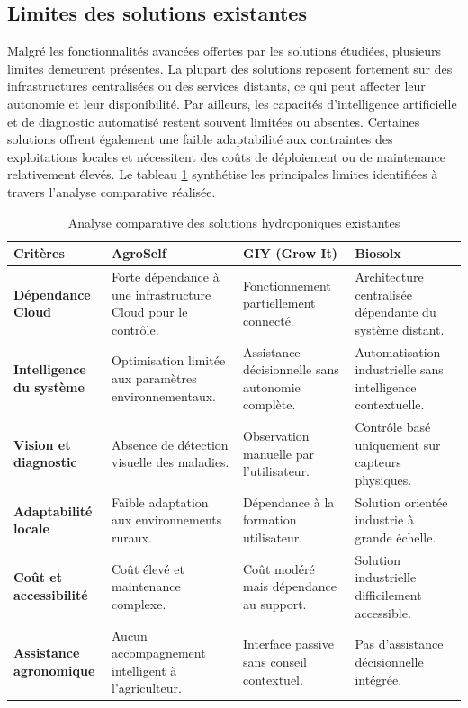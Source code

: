 \subsection{Limites des solutions existantes}

Malgré les fonctionnalités avancées offertes par les solutions étudiées, plusieurs limites demeurent présentes. La plupart des solutions reposent fortement sur des infrastructures centralisées ou des services distants, ce qui peut affecter leur autonomie et leur disponibilité. Par ailleurs, les capacités d’intelligence artificielle et de diagnostic automatisé restent souvent limitées ou absentes. Certaines solutions offrent également une faible adaptabilité aux contraintes des exploitations locales et nécessitent des coûts de déploiement ou de maintenance relativement élevés. Le tableau \ref{tab:comparaison-solutions} synthétise les principales limites identifiées à travers l’analyse comparative réalisée.

\begin{table}[!htbp] 
	\centering
	\small
	\renewcommand{\arraystretch}{1.5}
	\begin{tabular}{|p{3.5cm}|p{3.5cm}|p{3.5cm}|p{3.5cm}|}
		\hline
		\rowcolor[HTML]{ECECEC} 
		\textbf{Critères} & \textbf{AgroSelf} & \textbf{GIY (Grow It)} & \textbf{Biosolx} \\ \hline
		
		\textbf{Dépendance Cloud} & Forte dépendance à une infrastructure Cloud pour le contrôle. & Fonctionnement partiellement connecté. & Architecture centralisée dépendante du système distant. \\ \hline
		
		\textbf{Intelligence du système} & Optimisation limitée aux paramètres environnementaux. & Assistance décisionnelle sans autonomie complète. & Automatisation industrielle sans intelligence contextuelle. \\ \hline
		
		\textbf{Vision et diagnostic} & Absence de détection visuelle des maladies. & Observation manuelle par l’utilisateur. & Contrôle basé uniquement sur capteurs physiques. \\ \hline
		
		\textbf{Adaptabilité locale} & Faible adaptation aux environnements ruraux. & Dépendance à la formation utilisateur. & Solution orientée industrie à grande échelle. \\ \hline
		
		\textbf{Coût et accessibilité} & Coût élevé et maintenance complexe. & Coût modéré mais dépendance au support. & Solution industrielle difficilement accessible. \\ \hline

		\textbf{Assistance agronomique} & Aucun accompagnement intelligent à l'agriculteur. & Interface passive sans conseil contextuel. & Pas d'assistance décisionnelle intégrée. \\ \hline
	\end{tabular}
	\caption{Analyse comparative des solutions hydroponiques existantes}
	\label{tab:comparaison-solutions}
\end{table}

